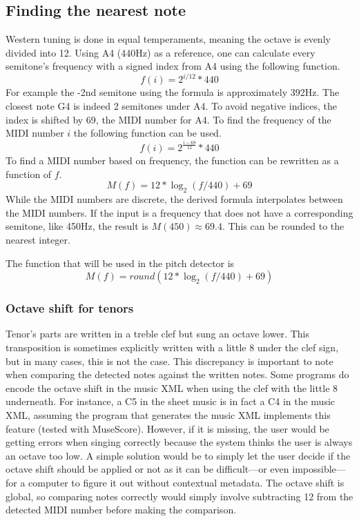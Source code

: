 \subsection{Finding the nearest note}
Western tuning is done in equal temperaments, meaning the octave is evenly divided into 12. Using A4 (440Hz) as a reference, one can calculate every semitone's frequency with a signed index from A4 using the following function. 
$$f(i) = 2^{i/12}*440$$
For example the -2nd semitone using the formula is approximately 392Hz. The closest note G4 is indeed 2 semitones under A4. To avoid negative indices, the index is shifted by 69, the MIDI number for A4. To find the frequency of the MIDI number $i$ the following function can be used.
$$f(i) = 2^{\frac{i-69}{12}}*440$$
To find a MIDI number based on frequency, the function can be rewritten as a function of $f$.
$$M(f) = 12*\log_2(f/440)+69$$
While the MIDI numbers are discrete, the derived formula interpolates between the MIDI numbers. If the input is a frequency that does not have a corresponding semitone, like 450Hz, the result is $M(450) \approx 69.4$. This can be rounded to the nearest integer.

The function that will be used in the pitch detector is
$$M(f) = round(12*\log_2(f/440)+69)$$

\subsubsection{Octave shift for tenors}
Tenor's parts are written in a treble clef but sung an octave lower. This transposition is sometimes explicitly written with a little 8 under the clef sign, but in many cases, this is not the case. This discrepancy is important to note when comparing the detected notes against the written notes. Some programs do encode the octave shift in the music XML when using the clef with the little 8 underneath. For instance, a C5 in the sheet music is in fact a C4 in the music XML, assuming the program that generates the music XML implements this feature (tested with MuseScore). However, if it is missing, the user would be getting errors when singing correctly because the system thinks the user is always an octave too low. A simple solution would be to simply let the user decide if the octave shift should be applied or not as it can be difficult—or even impossible—for a computer to figure it out without contextual metadata. The octave shift is global, so comparing notes correctly would simply involve subtracting 12 from the detected MIDI number before making the comparison.

